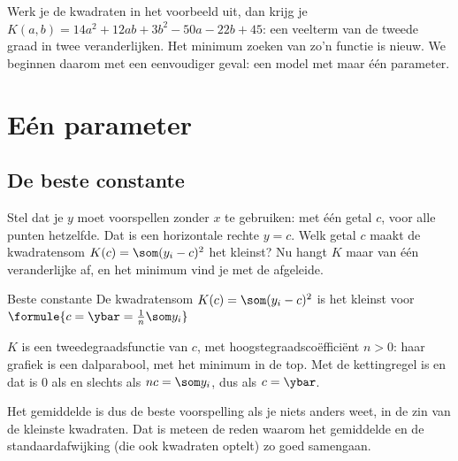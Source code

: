 \begin{oefeningen}
\end{oefeningen}

Werk je de kwadraten in het voorbeeld uit, dan krijg je $K(a, b) = 14a^2 + 12ab + 3b^2 - 50a - 22b + 45$: een veelterm van de tweede graad in twee veranderlijken. Het minimum zoeken van zo'n functie is nieuw. We beginnen daarom met een eenvoudiger geval: een model met maar één parameter.

\section{Eén parameter}

\subsection{De beste constante}

Stel dat je $y$ moet voorspellen zonder $x$ te gebruiken: met één getal $c$, voor alle punten hetzelfde. Dat is een horizontale rechte $y = c$. Welk getal $c$ maakt de kwadratensom $K(c) = \som (y_i - c)^2$ het kleinst? Nu hangt $K$ maar van één veranderlijke af, en het minimum vind je met de afgeleide.

\begin{theorie}
\begin{stelling}{Beste constante}
De kwadratensom $K(c) = \som (y_i - c)^2$ is het kleinst voor \quad $\formule{c = \ybar = \frac{1}{n}\som y_i}$
\end{stelling}

\begin{bewijs}
$K$ is een tweedegraadsfunctie van $c$, met hoogstegraadscoëfficiënt $n > 0$: haar grafiek is een dalparabool, met het minimum in de top. Met de kettingregel is
en dat is 0 als en slechts als $nc = \som y_i$, dus als $c = \ybar$.
\end{bewijs}
\end{theorie}

Het gemiddelde is dus de beste voorspelling als je niets anders weet, in de zin van de kleinste kwadraten. Dat is meteen de reden waarom het gemiddelde en de standaardafwijking (die ook kwadraten optelt) zo goed samengaan.

